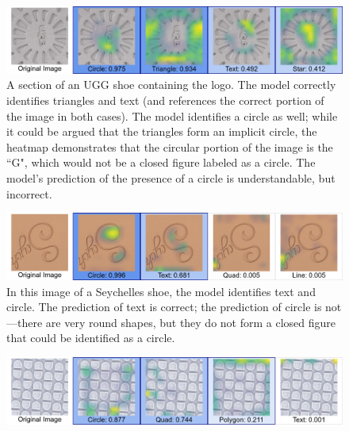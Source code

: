 \documentclass{article}\usepackage[]{graphicx}\usepackage[table]{xcolor}
\newenvironment{knitrout}{}{} %
\begin{document}
\begin{knitrout}
\color{fgcolor}\begin{figure}[!p]

{\centering \includegraphics[width=.95\textwidth]{images/heatmaps/processed/heatmap-a7-Ugg-grey}

}

\caption{A section of an UGG shoe containing the logo. The model correctly identifies triangles and text (and references the correct portion of the image in both cases). The model identifies a circle as well; while it could be argued that the triangles form an implicit circle, the heatmap demonstrates that the circular portion of the image is the ``G", which would not be a closed figure labeled as a circle. The model's prediction of the presence of a circle is understandable, but incorrect.\label{fig:ugg-heatmap}}\label{fig:current-heatmaps}
\end{figure}

\begin{figure}[!p]

{\centering \includegraphics[width=.95\textwidth]{images/heatmaps/processed/heatmap-text-seychelles}

}

\caption{In this image of a Seychelles shoe, the model identifies text and circle. The prediction of text is correct; the prediction of circle is not---there are very round shapes, but they do not form a closed figure that could be identified as a circle.\label{fig:seychelles-heatmap}}\label{fig:current-heatmaps}
\end{figure}

\begin{figure}[!p]

{\centering \includegraphics[width=.95\textwidth]{images/heatmaps/processed/heatmap-04-circle_quad-2-dc-vestrey-black-camo_product_9065558_color_12784}

}
\end{figure}
\end{knitrout}
\end{document}

